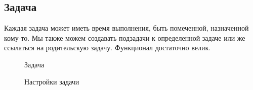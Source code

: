 \documentclass[12pt, a4paper]{article}
\begin{document}
    \subsection{Задача}
    Каждая задача может иметь время выполнения, быть помеченной, назначенной кому-то.
    Мы также можем создавать подзадачи к определенной задаче или же ссылаться на родительскую задачу.
    Функционал достаточно велик.
    \begin{multicols}{2}
        \begin{figure}[H]
            \caption{Задача}
        \end{figure}
        \columnbreak
        \begin{figure}[H]
            \caption{Настройки задачи}
        \end{figure}
    \end{multicols}
\end{document}
